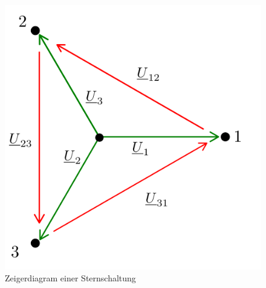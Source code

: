 \begin{enumerate}[label=\alph*)]
\begin{figure}[h!]
\begin{center}
\begin{minipage}[ct]{0.4\linewidth}
\begin{center}
					      \includegraphics[width=\linewidth]{img/2.2.1.2.png}
				      \end{center}
				      \caption{Zeigerdiagram einer Sternschaltung}\label{img/2.2.1.2}
			      \end{minipage}
		      \end{center}
	      \end{figure}


\end{enumerate}
